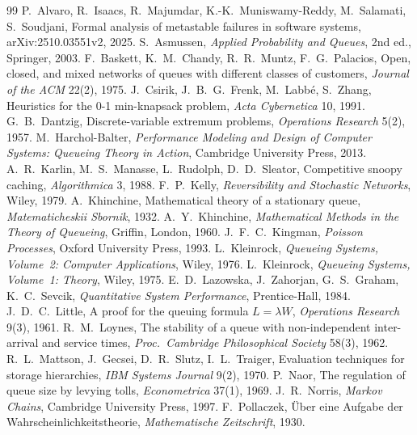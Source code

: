 \begin{thebibliography}{99}\small
{} P.~Alvaro, R.~Isaacs, R.~Majumdar, K.-K.~Muniswamy-Reddy, M.~Salamati, S.~Soudjani, Formal analysis of metastable failures in software systems, arXiv:2510.03551v2, 2025.
 S.~Asmussen, \emph{Applied Probability and Queues}, 2nd ed., Springer, 2003.
 F.~Baskett, K.~M.~Chandy, R.~R.~Muntz, F.~G.~Palacios, Open, closed, and mixed networks of queues with different classes of customers, \emph{Journal of the ACM} 22(2), 1975.
 J.~Csirik, J.~B.~G.~Frenk, M.~Labb\'e, S.~Zhang, Heuristics for the 0-1 min-knapsack problem, \emph{Acta Cybernetica} 10, 1991.
 G.~B.~Dantzig, Discrete-variable extremum problems, \emph{Operations Research} 5(2), 1957.
 M.~Harchol-Balter, \emph{Performance Modeling and Design of Computer Systems: Queueing Theory in Action}, Cambridge University Press, 2013.
 A.~R.~Karlin, M.~S.~Manasse, L.~Rudolph, D.~D.~Sleator, Competitive snoopy caching, \emph{Algorithmica} 3, 1988.
 F.~P.~Kelly, \emph{Reversibility and Stochastic Networks}, Wiley, 1979.
 A.~Khinchine, Mathematical theory of a stationary queue, \emph{Matematicheskii Sbornik}, 1932.
 A.~Y.~Khinchine, \emph{Mathematical Methods in the Theory of Queueing}, Griffin, London, 1960.
 J.~F.~C.~Kingman, \emph{Poisson Processes}, Oxford University Press, 1993.
 L.~Kleinrock, \emph{Queueing Systems, Volume~2: Computer Applications}, Wiley, 1976.
 L.~Kleinrock, \emph{Queueing Systems, Volume~1: Theory}, Wiley, 1975.
 E.~D.~Lazowska, J.~Zahorjan, G.~S.~Graham, K.~C.~Sevcik, \emph{Quantitative System Performance}, Prentice-Hall, 1984.
 J.~D.~C.~Little, A proof for the queuing formula $L=\lambda W$, \emph{Operations Research} 9(3), 1961.
 R.~M.~Loynes, The stability of a queue with non-independent inter-arrival and service times, \emph{Proc.\ Cambridge Philosophical Society} 58(3), 1962.
 R.~L.~Mattson, J.~Gecsei, D.~R.~Slutz, I.~L.~Traiger, Evaluation techniques for storage hierarchies, \emph{IBM Systems Journal} 9(2), 1970.
 P.~Naor, The regulation of queue size by levying tolls, \emph{Econometrica} 37(1), 1969.
 J.~R.~Norris, \emph{Markov Chains}, Cambridge University Press, 1997.
 F.~Pollaczek, \"Uber eine Aufgabe der Wahrscheinlichkeitstheorie, \emph{Mathematische Zeitschrift}, 1930.

\end{thebibliography}
